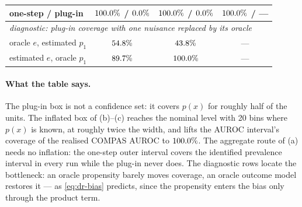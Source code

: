 \begin{table}[t]
\begin{tabular}{lccc}
one-step / plug-in     & $100.0\%$ / $0.0\%$ & $100.0\%$ / $0.0\%$ & $100.0\%$ / ---\\
\midrule
\multicolumn{4}{l}{\emph{diagnostic: plug-in coverage with one nuisance replaced by its oracle}}\\
oracle $e$, estimated $p_1$ & $54.8\%$ & $43.8\%$ & ---\\
estimated $e$, oracle $p_1$ & $89.7\%$ & $100.0\%$ & ---\\
\bottomrule
\end{tabular}
\end{table}

\paragraph{What the table says.} The plug-in box is not a confidence set: it
covers $p(x)$ for roughly half of the units. The inflated box of (b)--(c)
reaches the nominal level with 20 bins where $p(x)$ is known, at roughly
twice the width, and lifts the AUROC interval's coverage of the realised
COMPAS AUROC to $100.0\%$. The aggregate route
of (a) needs no inflation: the one-step outer interval covers the identified
prevalence interval in every run while the plug-in never does. The diagnostic
rows locate the bottleneck: an oracle propensity barely moves coverage, an
oracle outcome model restores it --- as \eqref{eq:dr-bias} predicts, since
the propensity enters the bias only through the product term.
